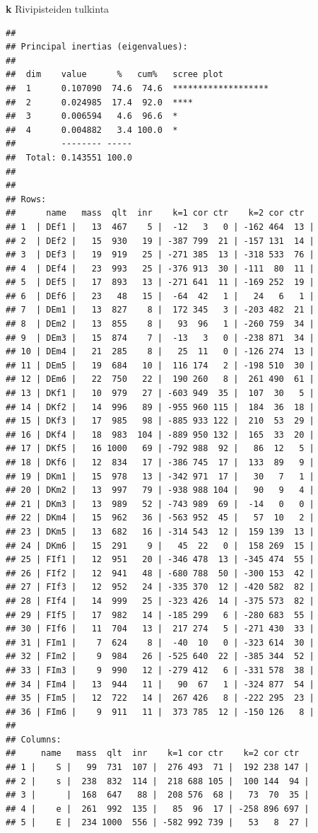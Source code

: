 \documentclass[
  finnish,
]{book}
\begin{document}
\textbf{k} Rivipisteiden tulkinta

\begin{verbatim}
## 
## Principal inertias (eigenvalues):
## 
##  dim    value      %   cum%   scree plot               
##  1      0.107090  74.6  74.6  *******************      
##  2      0.024985  17.4  92.0  ****                     
##  3      0.006594   4.6  96.6  *                        
##  4      0.004882   3.4 100.0  *                        
##         -------- -----                                 
##  Total: 0.143551 100.0                                 
## 
## 
## Rows:
##      name   mass  qlt  inr    k=1 cor ctr    k=2 cor ctr  
## 1  | DEf1 |   13  467    5 |  -12   3   0 | -162 464  13 |
## 2  | DEf2 |   15  930   19 | -387 799  21 | -157 131  14 |
## 3  | DEf3 |   19  919   25 | -271 385  13 | -318 533  76 |
## 4  | DEf4 |   23  993   25 | -376 913  30 | -111  80  11 |
## 5  | DEf5 |   17  893   13 | -271 641  11 | -169 252  19 |
## 6  | DEf6 |   23   48   15 |  -64  42   1 |   24   6   1 |
## 7  | DEm1 |   13  827    8 |  172 345   3 | -203 482  21 |
## 8  | DEm2 |   13  855    8 |   93  96   1 | -260 759  34 |
## 9  | DEm3 |   15  874    7 |  -13   3   0 | -238 871  34 |
## 10 | DEm4 |   21  285    8 |   25  11   0 | -126 274  13 |
## 11 | DEm5 |   19  684   10 |  116 174   2 | -198 510  30 |
## 12 | DEm6 |   22  750   22 |  190 260   8 |  261 490  61 |
## 13 | DKf1 |   10  979   27 | -603 949  35 |  107  30   5 |
## 14 | DKf2 |   14  996   89 | -955 960 115 |  184  36  18 |
## 15 | DKf3 |   17  985   98 | -885 933 122 |  210  53  29 |
## 16 | DKf4 |   18  983  104 | -889 950 132 |  165  33  20 |
## 17 | DKf5 |   16 1000   69 | -792 988  92 |   86  12   5 |
## 18 | DKf6 |   12  834   17 | -386 745  17 |  133  89   9 |
## 19 | DKm1 |   15  978   13 | -342 971  17 |   30   7   1 |
## 20 | DKm2 |   13  997   79 | -938 988 104 |   90   9   4 |
## 21 | DKm3 |   13  989   52 | -743 989  69 |  -14   0   0 |
## 22 | DKm4 |   15  962   36 | -563 952  45 |   57  10   2 |
## 23 | DKm5 |   13  682   16 | -314 543  12 |  159 139  13 |
## 24 | DKm6 |   15  291    9 |   45  22   0 |  158 269  15 |
## 25 | FIf1 |   12  951   20 | -346 478  13 | -345 474  55 |
## 26 | FIf2 |   12  941   48 | -680 788  50 | -300 153  42 |
## 27 | FIf3 |   12  952   24 | -335 370  12 | -420 582  82 |
## 28 | FIf4 |   14  999   25 | -323 426  14 | -375 573  82 |
## 29 | FIf5 |   17  982   14 | -185 299   6 | -280 683  55 |
## 30 | FIf6 |   11  704   13 |  217 274   5 | -271 430  33 |
## 31 | FIm1 |    7  624    8 |  -40  10   0 | -323 614  30 |
## 32 | FIm2 |    9  984   26 | -525 640  22 | -385 344  52 |
## 33 | FIm3 |    9  990   12 | -279 412   6 | -331 578  38 |
## 34 | FIm4 |   13  944   11 |   90  67   1 | -324 877  54 |
## 35 | FIm5 |   12  722   14 |  267 426   8 | -222 295  23 |
## 36 | FIm6 |    9  911   11 |  373 785  12 | -150 126   8 |
## 
## Columns:
##     name   mass  qlt  inr    k=1 cor ctr    k=2 cor ctr  
## 1 |    S |   99  731  107 |  276 493  71 |  192 238 147 |
## 2 |    s |  238  832  114 |  218 688 105 |  100 144  94 |
## 3 |      |  168  647   88 |  208 576  68 |   73  70  35 |
## 4 |    e |  261  992  135 |   85  96  17 | -258 896 697 |
## 5 |    E |  234 1000  556 | -582 992 739 |   53   8  27 |
\end{verbatim}
\end{document}
